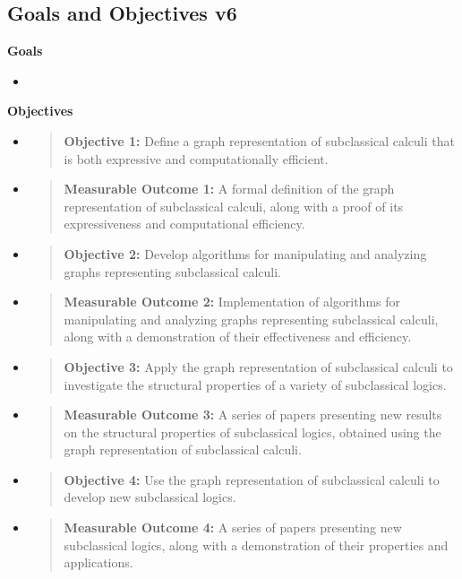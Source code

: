 \hypertarget{goals-and-objectives-v6}{%
\subsection{Goals and Objectives v6}\label{goals-and-objectives-v6}}

\textbf{Goals}

\begin{itemize}
\tightlist
\item
\end{itemize}

\textbf{Objectives}

\begin{itemize}
\item
  \begin{quote}
  \textbf{Objective 1:} Define a graph representation of subclassical
  calculi that is both expressive and computationally efficient.
  \end{quote}
\item
  \begin{quote}
  \textbf{Measurable Outcome 1:} A formal definition of the graph
  representation of subclassical calculi, along with a proof of its
  expressiveness and computational efficiency.
  \end{quote}
\item
  \begin{quote}
  \textbf{Objective 2:} Develop algorithms for manipulating and
  analyzing graphs representing subclassical calculi.
  \end{quote}
\item
  \begin{quote}
  \textbf{Measurable Outcome 2:} Implementation of algorithms for
  manipulating and analyzing graphs representing subclassical calculi,
  along with a demonstration of their effectiveness and efficiency.
  \end{quote}
\item
  \begin{quote}
  \textbf{Objective 3:} Apply the graph representation of subclassical
  calculi to investigate the structural properties of a variety of
  subclassical logics.
  \end{quote}
\item
  \begin{quote}
  \textbf{Measurable Outcome 3:} A series of papers presenting new
  results on the structural properties of subclassical logics, obtained
  using the graph representation of subclassical calculi.
  \end{quote}
\item
  \begin{quote}
  \textbf{Objective 4:} Use the graph representation of subclassical
  calculi to develop new subclassical logics.
  \end{quote}
\item
  \begin{quote}
  \textbf{Measurable Outcome 4:} A series of papers presenting new
  subclassical logics, along with a demonstration of their properties
  and applications.
  \end{quote}
\end{itemize}

